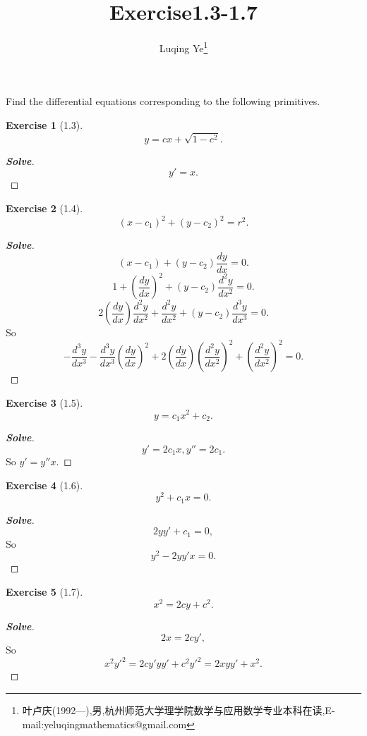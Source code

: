 \documentclass[a4paper]{article}
\newtheorem*{exe}{Exercise}
\newenvironment{exercise}
{\bigskip\begin{mdframed}\begin{exe}}
    {\end{exe}\end{mdframed}\bigskip}
\begin{document}
\title{\huge{\bf{Exercise1.3-1.7}}} \author{\small{Luqing Ye\footnote{叶卢庆(1992---),男,杭州师范大学理学院数学与应用数学专业本科在读,E-mail:yeluqingmathematics@gmail.com}}}
\maketitle
Find the differential equations corresponding to the following
primitives.
\begin{exercise}[1.3]

$$
y=cx+\sqrt{1-c^2}.
$$
\end{exercise}
\begin{proof}[\textbf{Solve}]
$$
y'=x.
$$  
\end{proof}
\begin{exercise}[1.4]
$$
(x-c_1)^2+(y-c_2)^2=r^2.
$$
\end{exercise}
\begin{proof}[\textbf{Solve}]
$$
(x-c_1)+(y-c_2)\frac{dy}{dx}=0.
$$
$$
1+\left(\frac{dy}{dx}\right)^{2}+(y-c_{2}) \frac{d^{2}y}{dx^2}=0.
$$
$$
2\left(\frac{dy}{dx}\right)\frac{d^2y}{dx^2}+\frac{d^2y}{dx^2}+(y-c_2)\frac{d^3y}{dx^3}=0.
$$
So 
$$
-\frac{d^3y}{dx^3}-\frac{d^3y}{dx^3}\left(\frac{dy}{dx}\right)^2+2\left(\frac{dy}{dx}\right)\left(\frac{d^2y}{dx^2}\right)^{2}+\left(\frac{d^2y}{dx^{2}}\right)^{2}=0.
$$
\end{proof}
\begin{exercise}[1.5]
$$
y=c_1x^2+c_2.
$$
\end{exercise}
\begin{proof}[\textbf{Solve}]
$$
y'=2c_1x,y''=2c_1.
$$
So $y'=y''x$.
\end{proof}
\begin{exercise}[1.6]
  $$ y^2+c_1x=0 .$$
\end{exercise}
\begin{proof}[\textbf{Solve}]
$$
2yy'+c_1=0,
$$
So
$$
y^2-2yy'x=0.
$$
\end{proof}
\begin{exercise}[1.7]
$$
x^2=2cy+c^2.
$$
\end{exercise}
\begin{proof}[\textbf{Solve}]
$$
2x=2cy',
$$
So
$$
x^2y'^{2}=2cy'yy'+c^2y'^2=2xyy'+x^2.
$$
\end{proof}
\end{document}
